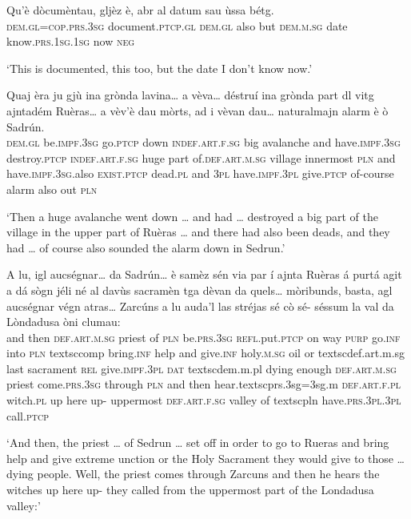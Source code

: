 \begin{linenumbers}
\gll    Qu’è dòcumèntau, gljèz è, abr al datum sau ùssa bétg. \\
\textsc{dem.gl=cop.prs.3sg} document.\textsc{ptcp.gl} \textsc{dem.gl} also but \textsc{dem.m.sg} date know.\textsc{prs.1sg.1sg} now \textsc{neg}\\
\end{linenumbers}
\medskip
\glt `This is documented, this too, but the date I don’t know now.'
\medskip

\begin{linenumbers}
\gll    Quaj èra ju gjù ina grònda lavina… a vèva… déstruí ina grònda part dl vitg ajntadém Ruèras… a vèv’è dau mòrts, ad i vèvan dau… naturalmajn alarm è ò Sadrún.\\
\textsc{dem.gl} be.\textsc{impf.3sg} go.\textsc{ptcp} down \textsc{indef.art.f.sg} big avalanche and have.\textsc{impf.3sg} destroy.\textsc{ptcp} \textsc{indef.art.f.sg} huge part of.\textsc{def.art.m.sg} village innermost \textsc{pln} and have.\textsc{impf.3sg}.also \textsc{exist.ptcp} dead.\textsc{pl} and \textsc{3pl} have.\textsc{impf.3pl} give.\textsc{ptcp} of-course alarm also out \textsc{pln}\\
\end{linenumbers}
\medskip
\glt `Then a huge avalanche went down … and had … destroyed a big part of the village in the upper part of Ruèras … and there had also been deads, and they had … of course also sounded the alarm down in Sedrun.'
\medskip

\begin{linenumbers}
\gll    A lu, igl aucségnar… da Sadrún… è samèz sén via par í ajnta Ruèras á purtá agit a dá sògn jéli né al davùs sacramèn tga dèvan da quels… mòribunds, basta, agl aucségnar végn atras… Zarcúns a lu auda’l las stréjas sé cò sé- séssum la val da Lòndadusa òni clumau:\\
and then \textsc{def.art.m.sg} priest of \textsc{pln} be.\textsc{prs.3sg} \textsc{refl.}put.\textsc{ptcp} on way \textsc{purp} go.\textsc{inf} into \textsc{pln}  textsc{comp} bring.\textsc{inf} help and give.\textsc{inf} holy.\textsc{m.sg} oil or textsc{def.art.m.sg} last sacrament \textsc{rel} give.\textsc{impf.3pl} \textsc{dat} textsc{dem.m.pl} dying enough \textsc{def.art.m.sg} priest come.\textsc{prs.3sg} through \textsc{pln} and then hear.textsc{prs.3sg=3sg.m} \textsc{def.art.f.pl} witch.\textsc{pl} up here up- uppermost \textsc{def.art.f.sg} valley of  textsc{pln} have.\textsc{prs.3pl.3pl} call.\textsc{ptcp}\\
\end{linenumbers}
\medskip
\glt `And then, the priest … of Sedrun … set off in order to go to Rueras and bring help and give extreme unction or the Holy Sacrament they would give to those … dying people. Well, the priest comes through Zarcuns and then he hears the witches up here up- they called from the uppermost part of the Londadusa valley:'
\medskip

